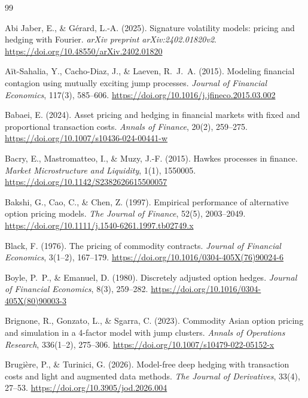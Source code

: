 \documentclass[11pt,a4paper]{article}
\begin{document}
\begin{thebibliography}{99}

Abi Jaber, E., \& G\'{e}rard, L.-A. (2025).
Signature volatility models: pricing and hedging with Fourier.
\emph{arXiv preprint arXiv:2402.01820v2}.
\url{https://doi.org/10.48550/arXiv.2402.01820}

A\"{i}t-Sahalia, Y., Cacho-Diaz, J., \& Laeven, R.~J.~A. (2015).
Modeling financial contagion using mutually exciting jump processes.
\emph{Journal of Financial Economics}, 117(3), 585--606.
\url{https://doi.org/10.1016/j.jfineco.2015.03.002}

Babaei, E. (2024).
Asset pricing and hedging in financial markets with fixed and proportional transaction costs.
\emph{Annals of Finance}, 20(2), 259--275.
\url{https://doi.org/10.1007/s10436-024-00441-w}

Bacry, E., Mastromatteo, I., \& Muzy, J.-F. (2015).
Hawkes processes in finance.
\emph{Market Microstructure and Liquidity}, 1(1), 1550005.
\url{https://doi.org/10.1142/S2382626615500057}

Bakshi, G., Cao, C., \& Chen, Z. (1997).
Empirical performance of alternative option pricing models.
\emph{The Journal of Finance}, 52(5), 2003--2049.
\url{https://doi.org/10.1111/j.1540-6261.1997.tb02749.x}

Black, F. (1976).
The pricing of commodity contracts.
\emph{Journal of Financial Economics}, 3(1--2), 167--179.
\url{https://doi.org/10.1016/0304-405X(76)90024-6}

Boyle, P.~P., \& Emanuel, D. (1980).
Discretely adjusted option hedges.
\emph{Journal of Financial Economics}, 8(3), 259--282.
\url{https://doi.org/10.1016/0304-405X(80)90003-3}

Brignone, R., Gonzato, L., \& Sgarra, C. (2023).
Commodity Asian option pricing and simulation in a 4-factor model with jump clusters.
\emph{Annals of Operations Research}, 336(1--2), 275--306.
\url{https://doi.org/10.1007/s10479-022-05152-x}

Brugi\`{e}re, P., \& Turinici, G. (2026).
Model-free deep hedging with transaction costs and light and augmented data methods.
\emph{The Journal of Derivatives}, 33(4), 27--53.
\url{https://doi.org/10.3905/jod.2026.004}


\end{thebibliography}
\end{document}
